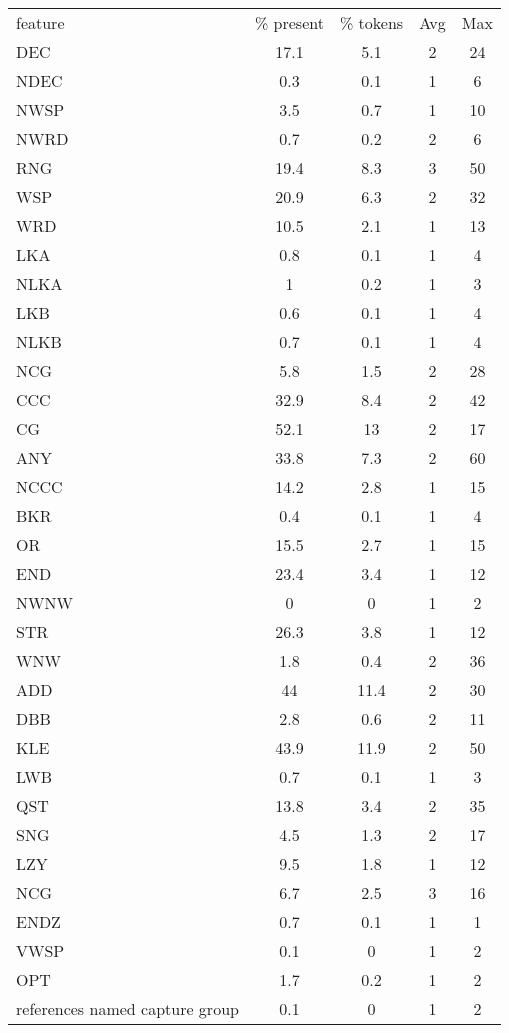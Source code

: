 \begin{center}
\begin{tabular}{lcccc}
\toprule
feature & \% present & \% tokens & Avg & Max \\ 
DEC & 17.1 & 5.1 & 2 & 24 \\ 
\midrule
NDEC & 0.3 & 0.1 & 1 & 6 \\ 
\midrule
NWSP & 3.5 & 0.7 & 1 & 10 \\ 
\midrule
NWRD & 0.7 & 0.2 & 2 & 6 \\ 
\midrule
RNG & 19.4 & 8.3 & 3 & 50 \\ 
\midrule
WSP & 20.9 & 6.3 & 2 & 32 \\ 
\midrule
WRD & 10.5 & 2.1 & 1 & 13 \\ 
\midrule
LKA & 0.8 & 0.1 & 1 & 4 \\ 
\midrule
NLKA & 1 & 0.2 & 1 & 3 \\ 
\midrule
LKB & 0.6 & 0.1 & 1 & 4 \\ 
\midrule
NLKB & 0.7 & 0.1 & 1 & 4 \\ 
\midrule
NCG & 5.8 & 1.5 & 2 & 28 \\ 
\midrule
CCC & 32.9 & 8.4 & 2 & 42 \\ 
\midrule
CG & 52.1 & 13 & 2 & 17 \\ 
\midrule
ANY & 33.8 & 7.3 & 2 & 60 \\ 
\midrule
NCCC & 14.2 & 2.8 & 1 & 15 \\ 
\midrule
BKR & 0.4 & 0.1 & 1 & 4 \\ 
\midrule
OR & 15.5 & 2.7 & 1 & 15 \\ 
\midrule
END & 23.4 & 3.4 & 1 & 12 \\ 
\midrule
NWNW & 0 & 0 & 1 & 2 \\ 
\midrule
STR & 26.3 & 3.8 & 1 & 12 \\ 
\midrule
WNW & 1.8 & 0.4 & 2 & 36 \\ 
\midrule
ADD & 44 & 11.4 & 2 & 30 \\ 
\midrule
DBB & 2.8 & 0.6 & 2 & 11 \\ 
\midrule
KLE & 43.9 & 11.9 & 2 & 50 \\ 
\midrule
LWB & 0.7 & 0.1 & 1 & 3 \\ 
\midrule
QST & 13.8 & 3.4 & 2 & 35 \\ 
\midrule
SNG & 4.5 & 1.3 & 2 & 17 \\ 
\midrule
LZY & 9.5 & 1.8 & 1 & 12 \\ 
\midrule
NCG & 6.7 & 2.5 & 3 & 16 \\ 
\midrule
ENDZ & 0.7 & 0.1 & 1 & 1 \\ 
\midrule
VWSP & 0.1 & 0 & 1 & 2 \\ 
\midrule
OPT & 1.7 & 0.2 & 1 & 2 \\ 
\midrule
references named capture group & 0.1 & 0 & 1 & 2 \\ 
\midrule
\bottomrule
\end{tabular}
\end{center}
